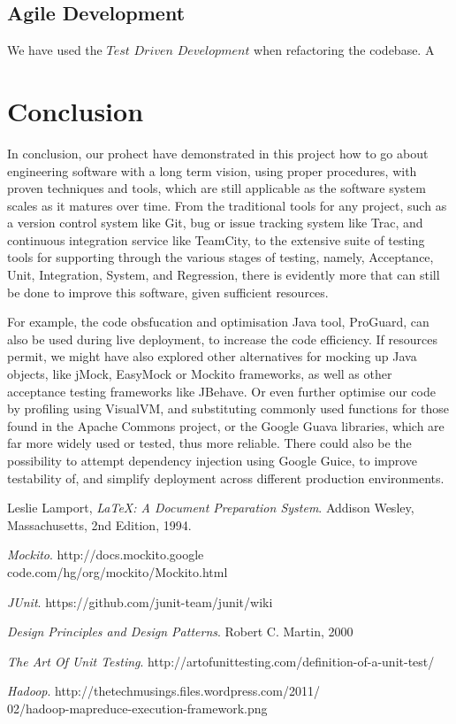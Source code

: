 \documentclass[11pt,twocolumn]{article} %
\begin{document}
\subsection{Agile Development}
We have used the $Test$ $Driven$ $Development$ when refactoring the codebase.
A


\section{Conclusion}
In conclusion, our prohect have demonstrated in this project how to go about engineering software
with a long term vision, using proper procedures, with proven techniques and tools, which
are still applicable as the software system scales as it matures over time.
From the traditional tools for any project, such as a version control system like Git, bug
or issue tracking system like Trac, and continuous integration service like TeamCity, to
the extensive suite of testing tools for supporting through the various stages of testing,
namely, Acceptance, Unit, Integration, System, and Regression, there is evidently more
that can still be done to improve this software, given sufficient resources.

For example, the code obsfucation and optimisation Java tool, ProGuard, can also be used
during live deployment, to increase the code efficiency. If resources permit, we might have
also explored other alternatives for mocking up Java objects, like jMock, EasyMock or
Mockito frameworks, as well as other acceptance testing frameworks like JBehave.
Or even further optimise our code by profiling using VisualVM, and substituting commonly
used functions for those found in the Apache Commons project, or the Google Guava
libraries, which are far more widely used or tested, thus more reliable. There could also be
the possibility to attempt dependency injection using Google Guice, to improve testability
of, and simplify deployment across different production environments.


\begin{thebibliography}{9}

  Leslie Lamport,
  \emph{\LaTeX: A Document Preparation System}.
  Addison Wesley, Massachusetts,
  2nd Edition,
  1994.

  \emph{Mockito}.
  http://docs.mockito.google\\code.com/hg/org/mockito/Mockito.html  

  \emph{JUnit}.
  https://github.com/junit-team/junit/wiki

  \emph{Design Principles and Design Patterns}.
  Robert C. Martin,
  2000

  \emph{The Art Of Unit Testing}.
  http://artofunittesting.com/definition-of-a-unit-test/

  \emph{Hadoop}.
  http://thetechmusings.files.wordpress.com/2011/\\02/hadoop-mapreduce-execution-framework.png
  
\end{thebibliography}
\end{document}
